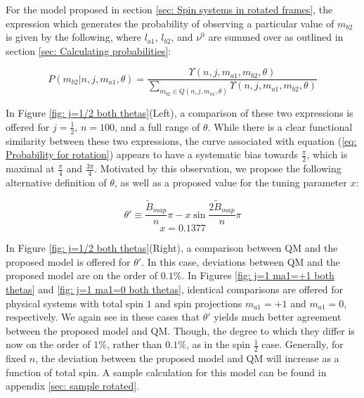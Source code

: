 \documentclass{article}
\begin{document}
For the model proposed in section \ref{sec: Spin systems in rotated frames}, the expression which generates the probability of observing a particular value of $m_{b2}$ is given by the following, where $l_{a1}$, $l_{b2}$, and $\nu^0$ are summed over as outlined in section \ref{sec: Calculating probabilities}:

\begin{equation}
    P(m_{b2}|n,j,m_{a1},\theta)=\frac{\Upsilon(n,j,m_{a1},m_{b2},\theta)}{\sum_{m_{b2}\in Q(n,j,m_{a1},\theta)}\Upsilon(n,j,m_{a1},m_{b2},\theta)}
    \label{eq: Probability for rotation}
\end{equation}

In Figure \ref{fig: j=1/2 both thetas}(Left), a comparison of these two expressions is offered for $j=\frac{1}{2}$, $n=100$, and a full range of $\theta$. While there is a clear functional similarity between these two expressions, the curve associated with equation (\ref{eq: Probability for rotation}) appears to have a systematic bias towards $\frac{\pi}{2}$, which is maximal at $\frac{\pi}{4}$ and $\frac{3\pi}{4}$. Motivated by this observation, we propose the following alternative definition of $\theta$, as well as a proposed value for the tuning parameter $x$:

\begin{equation}
    \theta' \equiv \frac{\tilde{B}_{map}}{n} \pi - x\sin{\frac{2\tilde{B}_{map}}{n} \pi}
    \label{eq: theta_prime}
\end{equation}
\begin{equation}
    x=0.1377
    \label{eq: x value}
\end{equation}

In Figure \ref{fig: j=1/2 both thetas}(Right), a comparison between QM and the proposed model is offered for $\theta'$. In this case, deviations between QM and the proposed model are on the order of $0.1\%$. In Figures \ref{fig: j=1 ma1=+1 both thetas} and \ref{fig: j=1 ma1=0 both thetas}, identical comparisons are offered for physical systems with total spin $1$ and spin projections $m_{a1}=+1$ and $m_{a1}=0$, respectively. We again see in these cases that $\theta'$ yields much better agreement between the proposed model and QM. Though, the degree to which they differ is now on the order of $1\%$, rather than $0.1\%$, as in the spin $\frac{1}{2}$ case. Generally, for fixed $n$, the deviation between the proposed model and QM will increase as a function of total spin. A sample calculation for this model can be found in appendix \ref{sec: sample rotated}.
\end{document}
